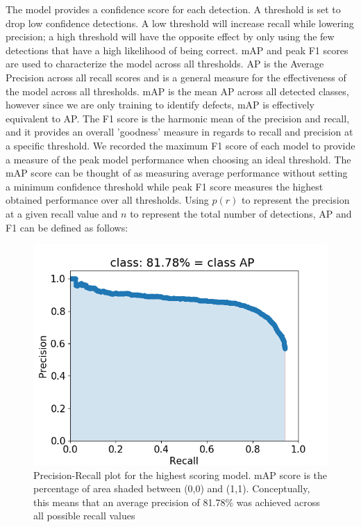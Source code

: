 \documentclass[prl,reprint,showpacs,floatfix,nofootinbib]{revtex4-1}
\begin{document}
The model provides a confidence score for each detection. A threshold is set to drop low confidence detections. A low threshold will increase recall while lowering precision; a high threshold will have the opposite effect by only using the few detections that have a high likelihood of being correct. mAP and peak F1 scores are used to characterize the model across all thresholds. AP is the Average Precision across all recall scores and is a general measure for the effectiveness of the model across all thresholds. mAP is the mean AP across all detected classes, however since we are only training to identify defects, mAP is effectively equivalent to AP. The F1 score is the harmonic mean of the precision and recall, and it provides an overall 'goodness' measure in regards to recall and precision at a specific threshold. We recorded the maximum F1 score of each model to provide a measure of the peak model performance when choosing an ideal threshold. The mAP\cite{everingham_pascal_2010} score can be thought of as measuring average performance without setting a minimum confidence threshold while peak F1\cite{chinchor_muc-4_1992} score measures the highest obtained performance over all thresholds. Using $p(r)$ to represent the precision at a given recall value and $n$ to represent the total number of detections, AP and F1 can be defined as follows:

\begin{figure}
  \includegraphics[width=\linewidth]{class.png}
  \caption{Precision-Recall plot for the highest scoring model. mAP score is the percentage of area shaded between (0,0) and (1,1). Conceptually, this means that an average precision of 81.78\% was achieved across all possible recall values}
  \label{fig:mAP score}
\end{figure}
\end{document}
